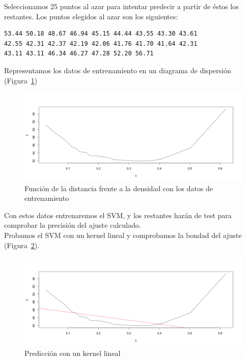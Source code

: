 \documentclass[12pt,a4paper,twoside,openright,titlepage,final]{article}
\begin{document}
Seleccionamos 25 puntos al azar para intentar predecir a partir de éstos los restantes. Los puntos elegidos al azar son los siguientes:

\begin{verbatim}
53.44 50.18 48.67 46.94 45.15 44.44 43.55 43.30 43.61 
42.55 42.31 42.37 42.19 42.06 41.76 41.70 41.64 42.31 
43.11 43.11 46.34 46.27 47.28 52.20 56.71
\end{verbatim}

Representamos los datos de entrenamiento en un diagrama de dispersión (Figura~\ref{fig:plot_datos_entrenamiento})\\

\begin{figure}
\centering
\includegraphics[width=0.8\linewidth]{imagenes/plot_datos_entrenamiento}
\caption{Función de la distancia frente a la densidad con los datos de entrenamiento}
\label{fig:plot_datos_entrenamiento}
\end{figure}

Con estos datos entrenaremos el SVM, y los restantes harán de test para comprobar la precisión del ajuste calculado.\\

Probamos el SVM con un kernel lineal y comprobamos la bondad del ajuste (Figura~\ref{fig:plot_kernel_lineal}).\\

\begin{figure}
\centering
\includegraphics[width=0.8\linewidth]{imagenes/plot_kernel_lineal}
\caption{Predicción con un kernel lineal}
\label{fig:plot_kernel_lineal}
\end{figure}
\end{document}
